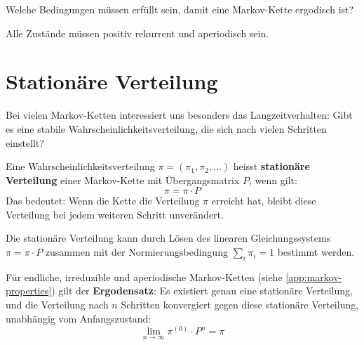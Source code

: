 \begin{mychallenge}[Ergodizität]
    Welche Bedingungen müssen erfüllt sein, damit eine Markov-Kette ergodisch ist?

    \begin{myanswer}
        Alle Zustände müssen positiv rekurrent und aperiodisch sein.
    \end{myanswer}
\end{mychallenge}

\section{Stationäre Verteilung}

Bei vielen Markov-Ketten interessiert uns besonders das Langzeitverhalten: Gibt es eine stabile Wahrscheinlichkeitsverteilung, die sich nach vielen Schritten einstellt?

\begin{mydefinition}
    Eine Wahrscheinlichkeitsverteilung $\pi = (\pi_1, \pi_2, \ldots)$ heisst \textbf{stationäre Verteilung} einer Markov-Kette mit Übergangsmatrix $P$, wenn gilt:
    \[
        \pi = \pi \cdot P
    \]
    Das bedeutet: Wenn die Kette die Verteilung $\pi$ erreicht hat, bleibt diese Verteilung bei jedem weiteren Schritt unverändert.
\end{mydefinition}

Die stationäre Verteilung kann durch Lösen des linearen Gleichungssystems $\pi = \pi \cdot P$ zusammen mit der Normierungsbedingung $\sum_i \pi_i = 1$ bestimmt werden.

Für endliche, irreduzible und aperiodische Markov-Ketten (siehe \cref{app:markov-properties}) gilt der \textbf{Ergodensatz}: Es existiert genau eine stationäre Verteilung, und die Verteilung nach $n$ Schritten konvergiert gegen diese stationäre Verteilung, unabhängig vom Anfangszustand:
\[
    \lim_{n\to\infty} \pi^{(0)} \cdot P^n = \pi
\]

